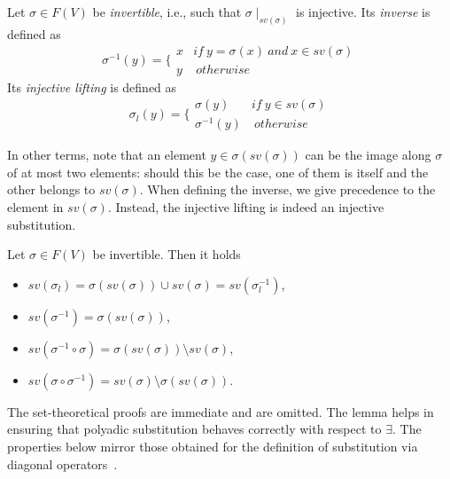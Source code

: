 \documentclass{llncs}
\begin{document}

\begin{definition}
	\label{def:inverse}
	Let $\sigma \in F(V)$ be \emph{invertible}, i.e., such that $\sigma \mid_{sv(\sigma)}$ is injective.
	Its \emph{inverse} is defined as
	$$\sigma^{-1}(y) = \bigg \{\begin{array}{rl}
	x & if \ y = \sigma(x) \ and \ x \in sv(\sigma) \\
		y & \ otherwise
	\end{array}$$
Its \emph{injective lifting} is defined as
	$$\sigma_l(y) = \bigg \{\begin{array}{ll}
	\sigma(y) & if \ y \in sv(\sigma) \\
	\sigma^{-1}(y) & \ otherwise
	\end{array}$$
\end{definition}

In other terms, note that an element $y \in \sigma(sv(\sigma))$ can be the image along $\sigma$ of at most two elements: 
should this be the case, one of them is itself 
and the other belongs to $sv(\sigma)$.
When defining the inverse, we give precedence to the element in $sv(\sigma)$.
%
Instead, the injective lifting is indeed an injective substitution.

\begin{lemma} \label{lemma:Inv0}
Let $\sigma \in F(V)$ be invertible. Then it holds
\begin{itemize}
\item $sv(\sigma_l) = \sigma(sv(\sigma)) \cup sv(\sigma) = sv(\sigma_l^{-1})$,
\item $sv(\sigma^{-1}) = \sigma(sv(\sigma))$,
\item $sv(\sigma^{-1} \circ \sigma) = \sigma(sv(\sigma)) \setminus sv(\sigma)$,
\item $sv(\sigma \circ \sigma^{-1}) = sv(\sigma) \setminus \sigma(sv(\sigma))$.
\end{itemize}
\end{lemma}

The set-theoretical proofs are immediate and are omitted.
The lemma helps in ensuring that polyadic substitution behaves correctly with respect to $\exists$. 
The properties below mirror 
those obtained for the definition of substitution via diagonal operators~\cite{jlamp17}.
\end{document}
